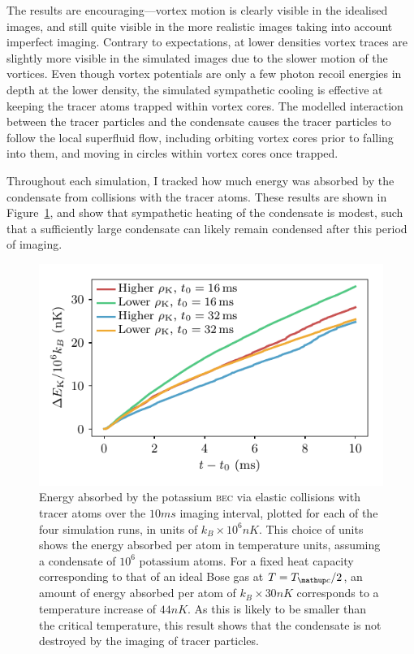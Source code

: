 The results are encouraging---vortex motion is clearly visible in the idealised images, and still quite visible in the more realistic images taking into account imperfect imaging. Contrary to expectations, at lower densities vortex traces are slightly more visible in the simulated images due to the slower motion of the vortices. Even though vortex potentials are only a few photon recoil energies in depth at the lower density, the simulated sympathetic cooling is effective at keeping the tracer atoms trapped within vortex cores. The modelled interaction between the tracer particles and the condensate causes the tracer particles to follow the local superfluid flow, including orbiting vortex cores prior to falling into them, and moving in circles within vortex cores once trapped.

Throughout each simulation, I tracked how much energy was absorbed by the condensate from collisions with the tracer atoms. These results are shown in Figure~\ref{fig:BEC_energy}, and show that sympathetic heating of the condensate is modest, such that a sufficiently large condensate can likely remain condensed after this period of imaging.

\begin{figure}
\begin{center}
\includegraphics{figures/velocimetry/energy.pdf}
\caption{Energy absorbed by the potassium \textsc{bec} via elastic collisions with tracer atoms over the $10\unit{ms}$ imaging interval, plotted for each of the four simulation runs, in units of $k_B\times10^6\unit{nK}$. This choice of units shows the energy absorbed per atom in temperature units, assuming a condensate of $10^6$ potassium atoms. For a fixed heat capacity corresponding to that of an ideal Bose gas at $T = T_\up{c}/2$, an amount of energy absorbed per atom of $k_B\times 30\unit{nK}$ corresponds to a temperature increase of $44\unit{nK}$. As this is likely to be smaller than the critical temperature, this result shows that the condensate is not destroyed by the imaging of tracer particles.}\label{fig:BEC_energy}
\end{center}
\end{figure}

